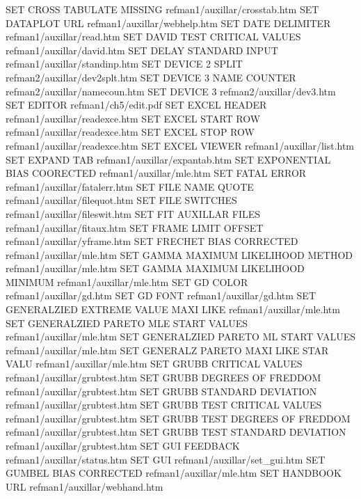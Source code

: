 SET CROSS TABULATE MISSING              refman1/auxillar/crosstab.htm
SET DATAPLOT URL                        refman1/auxillar/webhelp.htm
SET DATE DELIMITER                      refman1/auxillar/read.htm
SET DAVID TEST CRITICAL VALUES          refman1/auxillar/david.htm
SET DELAY STANDARD INPUT                refman1/auxillar/standinp.htm
SET DEVICE 2 SPLIT                      refman2/auxillar/dev2splt.htm
SET DEVICE 3 NAME COUNTER               refman2/auxillar/namecoun.htm
SET DEVICE 3                            refman2/auxillar/dev3.htm
SET EDITOR                              refman1/ch5/edit.pdf
SET EXCEL HEADER                        refman1/auxillar/readexce.htm
SET EXCEL START ROW                     refman1/auxillar/readexce.htm
SET EXCEL STOP ROW                      refman1/auxillar/readexce.htm
SET EXCEL VIEWER                        refman1/auxillar/list.htm
SET EXPAND TAB                          refman1/auxillar/expantab.htm
SET EXPONENTIAL BIAS COORECTED          refman1/auxillar/mle.htm
SET FATAL ERROR                         refman1/auxillar/fatalerr.htm
SET FILE NAME QUOTE                     refman1/auxillar/filequot.htm
SET FILE SWITCHES                       refman1/auxillar/fileswit.htm
SET FIT AUXILLAR FILES                  refman1/auxillar/fitaux.htm
SET FRAME LIMIT OFFSET                  refman1/auxillar/yframe.htm
SET FRECHET BIAS CORRECTED              refman1/auxillar/mle.htm
SET GAMMA MAXIMUM LIKELIHOOD METHOD     refman1/auxillar/mle.htm
SET GAMMA MAXIMUM LIKELIHOOD MINIMUM    refman1/auxillar/mle.htm
SET GD COLOR                            refman1/auxillar/gd.htm
SET GD FONT                             refman1/auxillar/gd.htm
SET GENERALZIED EXTREME VALUE MAXI LIKE refman1/auxillar/mle.htm
SET GENERALZIED PARETO MLE START VALUES refman1/auxillar/mle.htm
SET GENERALZIED PARETO ML START VALUES  refman1/auxillar/mle.htm
SET GENERALZ PARETO MAXI LIKE STAR VALU refman1/auxillar/mle.htm
SET GRUBB CRITICAL VALUES               refman1/auxillar/grubtest.htm
SET GRUBB DEGREES OF FREDDOM            refman1/auxillar/grubtest.htm
SET GRUBB STANDARD DEVIATION            refman1/auxillar/grubtest.htm
SET GRUBB TEST CRITICAL VALUES          refman1/auxillar/grubtest.htm
SET GRUBB TEST DEGREES OF FREDDOM       refman1/auxillar/grubtest.htm
SET GRUBB TEST STANDARD DEVIATION       refman1/auxillar/grubtest.htm
SET GUI FEEDBACK                        refman1/auxillar/status.htm
SET GUI                                 refman1/auxillar/set_gui.htm
SET GUMBEL BIAS CORRECTED               refman1/auxillar/mle.htm
SET HANDBOOK URL                        refman1/auxillar/webhand.htm
